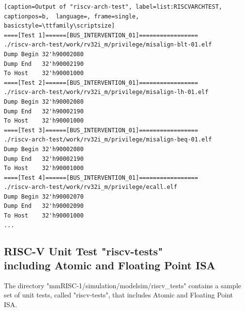 \begin{lstlisting}[caption=Output of "riscv-arch-test", label=list:RISCVARCHTEST, captionpos=b,  language=, frame=single, basicstyle=\ttfamily\scriptsize]
====[Test 1]======[BUS_INTERVENTION_01]=================
./riscv-arch-test/work/rv32i_m/privilege/misalign-blt-01.elf
Dump Begin 32'h90002080
Dump End   32'h90002190
To Host    32'h90001000
====[Test 2]======[BUS_INTERVENTION_01]=================
./riscv-arch-test/work/rv32i_m/privilege/misalign-lh-01.elf
Dump Begin 32'h90002080
Dump End   32'h90002190
To Host    32'h90001000
====[Test 3]======[BUS_INTERVENTION_01]=================
./riscv-arch-test/work/rv32i_m/privilege/misalign-beq-01.elf
Dump Begin 32'h90002080
Dump End   32'h90002190
To Host    32'h90001000
====[Test 4]======[BUS_INTERVENTION_01]=================
./riscv-arch-test/work/rv32i_m/privilege/ecall.elf
Dump Begin 32'h90002070
Dump End   32'h90002090
To Host    32'h90001000
...
\end{lstlisting}

\subsection{RISC-V Unit Test "riscv-tests" \\including Atomic and Floating Point ISA}

The directory "mmRISC-1/simulation/modelsim/riscv\_tests" contains a sample set of unit tests, called "riscv-tests", that includes Atomic and Floating Point ISA.

